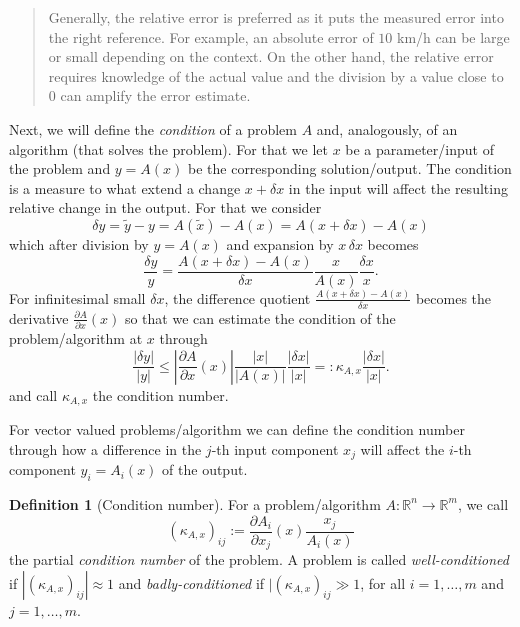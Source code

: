\documentclass[
]{book}
\newenvironment {JHSAYS} [0] {\begin{quote}\color{jhsc}} {\end{quote}}
\theoremstyle{definition}
\newtheorem{definition}{Definition}[chapter]
\theoremstyle{definition}
\theoremstyle{definition}
\theoremstyle{definition}
\theoremstyle{remark}
\begin{document}
\leavevmode\hypertarget{rem-rel-abs-err}{}%
\begin{JHSAYS}
Generally, the relative error is preferred as it puts the measured error into the right reference. For example, an absolute error of \(10\) km/h can be large or small depending on the context. On the other hand, the relative error requires knowledge of the actual value and the division by a value close to \(0\) can amplify the error estimate.

\end{JHSAYS}

Next, we will define the \emph{condition} of a problem \(A\) and, analogously, of an algorithm (that solves the problem). For that we let \(x\) be a parameter/input of the problem and \(y=A(x)\) be the corresponding solution/output. The condition is a measure to what extend a change \(x+\delta x\) in the input will affect the resulting relative change in the output. For that we consider
\begin{equation*}
\delta y = \tilde y - y = A(\tilde x) - A(x) = A(x+\delta x) - A(x)
\end{equation*}
which after division by \(y=A(x)\) and expansion by \(x\,\delta x\) becomes
\begin{equation*}
\frac{\delta y}{y} = \frac{A(x+\delta x)-A(x)}{\delta x}\frac{x}{A(x)}\frac{\delta x}{x}.
\end{equation*}
For infinitesimal small \(\delta x\), the difference quotient \(\frac{A(x+\delta x)-A(x)}{\delta x}\) becomes the derivative \(\frac{\partial A}{\partial x}(x)\) so that we can estimate the condition of the problem/algorithm at \(x\) through
\begin{equation}\label{eq:eqn-scalar-cond}
\frac{|\delta y|}{|y|} \leq |\frac{\partial A}{\partial x}(x)|\frac{|x|}{|A(x)|}\frac{|\delta x|}{|x|}=:\kappa_{A,x}\frac{|\delta x|}{|x|}.
\end{equation}
and call \(\kappa_{A,x}\) the condition number.

For vector valued problems/algorithm we can define the condition number through how a difference in the \(j\)-th input component \(x_j\) will affect the \(i\)-th component \(y_i=A_i(x)\) of the output.

\begin{definition}[Condition number]
\protect\hypertarget{def:condition}{}\label{def:condition}For a problem/algorithm \(A\colon \mathbb R^{n}\to \mathbb R^{m}\), we call
\begin{equation*}
(\kappa_{A,x})_{ij} := \frac{\partial A_i}{\partial x_j}(x) \frac{x_j}{A_i(x)}
\end{equation*}
the partial \emph{condition number} of the problem. A problem is called \emph{well-conditioned} if \(|(\kappa_{A,x})_{ij}|\approx 1\) and \emph{badly-conditioned} if \(|(\kappa_{A,x})_{ij}\gg 1\), for all \(i=1,\dotsc,m\) and \(j=1,\dotsc,m\).
\end{definition}
\end{document}
